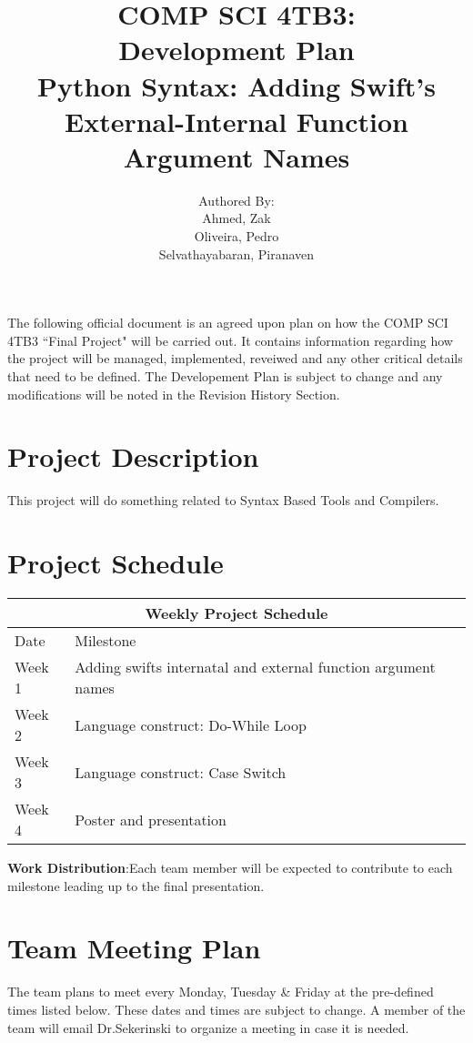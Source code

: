 \documentclass{article}
\title{COMP SCI 4TB3:\\ Development Plan\\ Python Syntax:  Adding Swift's External-Internal Function Argument Names}
\author{ Authored By:
		\\ Ahmed, Zak
		\\ Oliveira, Pedro
		\\ Selvathayabaran, Piranaven
}
\date{}
\begin{document}
\newpage

\maketitle

The following official document is an agreed upon plan on how the COMP SCI 4TB3 ``Final Project" will be carried out. It contains information regarding how the project will be managed, implemented, reveiwed and any other critical details that need to be defined. The Developement Plan is subject to change and any modifications will be noted in the Revision History Section. 

\tableofcontents 

\section {Project Description}
This project will do something related to Syntax Based Tools and Compilers.
 
 \section{Project Schedule}

\begin{tabular}{ |p{3cm}||p{10cm}| }
 \hline
 \multicolumn{3}{|c|}{Weekly Project Schedule} \\
 \hline
 Date & Milestone \\
  \hline
 Week 1 & Adding swifts internatal and external function argument names\\
 Week 2 & Language construct: Do-While Loop \\
 Week 3 & Language construct: Case Switch \\
  Week 4 & Poster and presentation \\
 \hline



 \hline
\end{tabular}

\linebreak
\par
\textbf{Work Distribution}:Each team member will be expected to contribute to each milestone leading up to the final presentation.
 
\section{Team Meeting Plan}
The team plans to meet every Monday, Tuesday \& Friday at the pre-defined times listed below. These dates and times are subject to change. A member of the team will email Dr.Sekerinski to organize a meeting in case it is needed.\newline 
\end{document}
